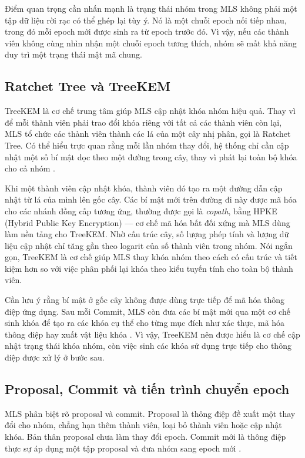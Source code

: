 \documentclass[../DoAn.tex]{subfiles}
\begin{document}
Điểm quan trọng cần nhấn mạnh là trạng thái nhóm trong MLS không phải một tập dữ liệu rời rạc có thể ghép lại tùy ý. Nó là một chuỗi epoch nối tiếp nhau, trong đó mỗi epoch mới được sinh ra từ epoch trước đó. Vì vậy, nếu các thành viên không cùng nhìn nhận một chuỗi epoch tương thích, nhóm sẽ mất khả năng duy trì một trạng thái mật mã chung.

\subsection{Ratchet Tree và TreeKEM}

TreeKEM là cơ chế trung tâm giúp MLS cập nhật khóa nhóm hiệu quả. Thay vì để mỗi thành viên phải trao đổi khóa riêng với tất cả các thành viên còn lại, MLS tổ chức các thành viên thành các lá của một cây nhị phân, gọi là Ratchet Tree. Có thể hiểu trực quan rằng mỗi lần nhóm thay đổi, hệ thống chỉ cần cập nhật một số bí mật dọc theo một đường trong cây, thay vì phát lại toàn bộ khóa cho cả nhóm \cite{rfc9420}.

Khi một thành viên cập nhật khóa, thành viên đó tạo ra một đường dẫn cập nhật từ lá của mình lên gốc cây. Các bí mật mới trên đường đi này được mã hóa cho các nhánh đồng cấp tương ứng, thường được gọi là \textit{copath}, bằng HPKE (Hybrid Public Key Encryption) \cite{rfc9180} --- cơ chế mã hóa bất đối xứng mà MLS dùng làm nền tảng cho TreeKEM. Nhờ cấu trúc cây, số lượng phép tính và lượng dữ liệu cập nhật chỉ tăng gần theo logarit của số thành viên trong nhóm. Nói ngắn gọn, TreeKEM là cơ chế giúp MLS thay khóa nhóm theo cách có cấu trúc và tiết kiệm hơn so với việc phân phối lại khóa theo kiểu tuyến tính cho toàn bộ thành viên.

Cần lưu ý rằng bí mật ở gốc cây không được dùng trực tiếp để mã hóa thông điệp ứng dụng. Sau mỗi Commit, MLS còn đưa các bí mật mới qua một cơ chế sinh khóa để tạo ra các khóa cụ thể cho từng mục đích như xác thực, mã hóa thông điệp hay xuất vật liệu khóa \cite{rfc9420}. Vì vậy, TreeKEM nên được hiểu là cơ chế cập nhật trạng thái khóa nhóm, còn việc sinh các khóa sử dụng trực tiếp cho thông điệp được xử lý ở bước sau.

\subsection{Proposal, Commit và tiến trình chuyển epoch}

MLS phân biệt rõ proposal và commit. Proposal là thông điệp đề xuất một thay đổi cho nhóm, chẳng hạn thêm thành viên, loại bỏ thành viên hoặc cập nhật khóa. Bản thân proposal chưa làm thay đổi epoch. Commit mới là thông điệp thực sự áp dụng một tập proposal và đưa nhóm sang epoch mới \cite{rfc9420}.
\end{document}
